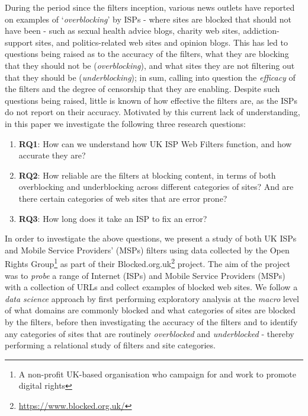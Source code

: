 \documentclass{bmcart}
\begin{document}
During the period since the filters inception, various news outlets have reported on examples of `\textit{overblocking}' by ISPs - where sites are blocked that should not have been - such as sexual health advice blogs, charity web sites, addiction-support sites, and politics-related web sites and opinion blogs.
This has led to questions being raised as to the accuracy of the filters, what they are blocking that they should not be (\textit{overblocking}), and what sites they are not filtering out that they should be (\textit{underblocking}); in sum, calling into question the \textit{efficacy} of the filters and the degree of censorship that they are enabling.
Despite such questions being raised, little is known of how effective the filters are, as the ISPs do not report on their accuracy.
Motivated by this current lack of understanding, in this paper we investigate the following three research questions:

\begin{enumerate}
	\item \textbf{RQ1}: How can we understand how UK ISP Web Filters function, and how accurate they are?
	\item \textbf{RQ2}: How reliable are the filters at blocking content, in terms of both overblocking and underblocking across different categories of sites? And are there certain categories of web sites that are error prone?
	\item \textbf{RQ3}: How long does it take an ISP to fix an error?
\end{enumerate}

In order to investigate the above questions, we present a study of both UK ISPs and Mobile Service Providers' (MSPs) filters using data collected by the Open Rights Group\footnote{A non-profit UK-based organisation who campaign for and work to promote digital rights} as part of their Blocked.org.uk\footnote{\url{https://www.blocked.org.uk/}} project.
The aim of the project was to \textit{probe} a range of Internet (ISPs) and Mobile Service Providers (MSPs) with a collection of URLs and collect examples of blocked web sites.
We follow a \textit{data science} approach by first performing exploratory analysis at the \textit{macro} level of what domains are commonly blocked and what categories of sites are blocked by the filters, before then investigating the accuracy of the filters and to identify any categories of sites that are routinely \textit{overblocked} and \textit{underblocked} - thereby performing a relational study of filters and site categories.
\end{document}

